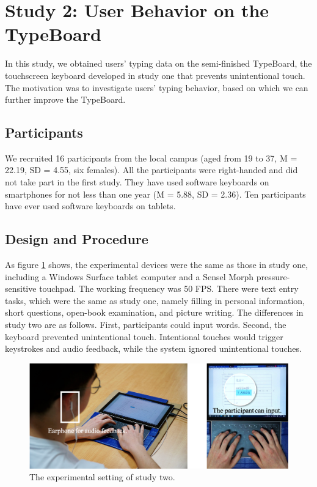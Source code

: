 \section{Study 2: User Behavior on the TypeBoard}

In this study, we obtained users' typing data on the semi-finished TypeBoard, the touchscreen keyboard developed in study one that prevents unintentional touch. The motivation was to investigate users' typing behavior, based on which we can further improve the TypeBoard.


\subsection{Participants}

We recruited 16 participants from the local campus (aged from 19 to 37, M = 22.19, SD = 4.55, six females). All the participants were right-handed and did not take part in the first study. They have used software keyboards on smartphones for not less than one year (M = 5.88, SD = 2.36). Ten participants have ever used software keyboards on tablets.

\subsection{Design and Procedure}

As figure \ref{fig:study2_illu} shows, the experimental devices were the same as those in study one, including a Windows Surface tablet computer and a Sensel Morph pressure-sensitive touchpad. The working frequency was 50 FPS. There were text entry tasks, which were the same as study one, namely filling in personal information, short questions, open-book examination, and picture writing. The differences in study two are as follows. First, participants could input words. Second, the keyboard prevented unintentional touch. Intentional touches would trigger keystrokes and audio feedback, while the system ignored unintentional touches.

\begin{figure}[!tbh]
	\includegraphics[width=0.9\linewidth]{figures/study2_illu.png}
	\centering
	\caption{The experimental setting of study two.}
	\label{fig:study2_illu}
\end{figure}

